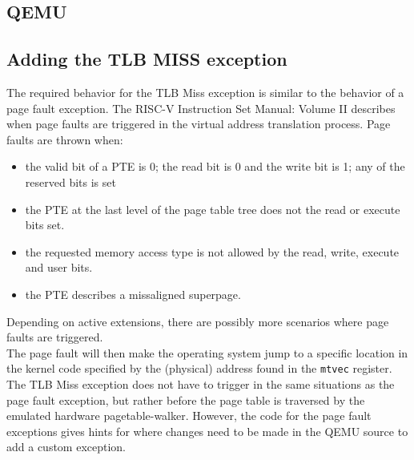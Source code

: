 \subsection{QEMU}



\subsection{Adding the TLB MISS exception}
The required behavior for the TLB Miss exception is similar to the behavior of a page fault exception.
The RISC-V Instruction Set Manual: Volume II \cite{RISCVInstructionSet} describes when page faults
are triggered in the virtual address translation process. Page faults are thrown when:
\begin{itemize}
    \item the valid bit of a PTE is 0; the read bit is 0 and the write bit is 1; any of the reserved
          bits is set
    \item the PTE at the last level of the page table tree does not the read or execute bits set.
    \item the requested memory access type is not allowed by the read, write, execute and user bits.
    \item the PTE describes a missaligned superpage.
\end{itemize}
Depending on active extensions, there are possibly more scenarios where page faults are triggered.\\
The page fault will then make the operating system jump to a specific location in the kernel code
specified by the (physical) address found in the \texttt{mtvec} register.\\
The TLB Miss exception does not have to trigger in the same situations as the page fault exception,
but rather before the page table is traversed by the emulated hardware pagetable-walker.
However, the code for the page fault exceptions gives hints for where changes need to be made in the QEMU
source to add a custom exception.\\ %

